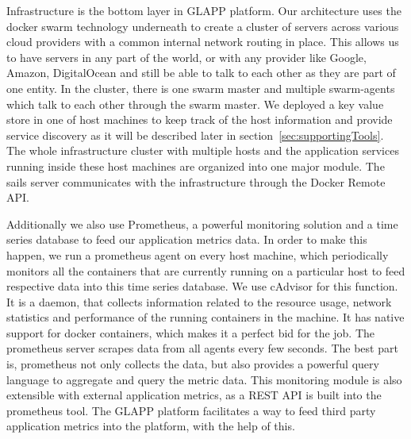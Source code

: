 \documentclass{seal_thesis}
\begin{document}
Infrastructure is the bottom layer in GLAPP platform. 
Our architecture uses the docker swarm technology underneath to create a cluster of servers across various cloud providers with a common internal network routing in place. 
This allows us to have servers in any part of the world, or with any provider like Google, Amazon, DigitalOcean and still be able to talk to each other as they are part of one entity. 
In the cluster, there is one swarm master and multiple swarm-agents which talk to each other through the swarm master. 
We deployed a key value store in one of host machines to keep track of the host information and provide service discovery as it will be described later in section~\ref{sec:supportingTools}.
The whole infrastructure cluster with multiple hosts and the application services running inside these host machines are organized into one major module. 
The sails server communicates with the infrastructure through the Docker Remote API. 

Additionally we also use Prometheus, a powerful monitoring solution and a time series database to feed our application metrics data. 
In order to make this happen, we run a prometheus agent on every host machine, which periodically monitors all the containers that are currently running on a particular host to feed respective data into this time series database. 
We use cAdvisor for this function. 
It is a daemon, that collects information related to the resource usage, network statistics and performance of the running containers in the machine. 
It has native support for docker containers, which makes it a perfect bid for the job. 
The prometheus server scrapes data from all agents every few seconds. 
The best part is, prometheus not only collects the data, but also provides a powerful query language to aggregate and query the metric data. 
This monitoring module is also extensible with external application metrics, as a REST API is built into the prometheus tool. 
The GLAPP platform facilitates a way to feed third party application metrics into the platform, with the help of this.
\end{document}
